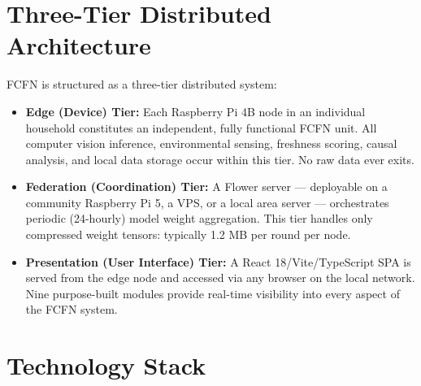 \documentclass[12pt,a4paper]{report}
\begin{document}
\section{Three-Tier Distributed Architecture}

FCFN is structured as a three-tier distributed system:

\begin{itemize}[leftmargin=2em, itemsep=0.2em]
    \item \textbf{Edge (Device) Tier:} Each Raspberry Pi 4B node in an individual household constitutes an independent, fully functional FCFN unit. All computer vision inference, environmental sensing, freshness scoring, causal analysis, and local data storage occur within this tier. No raw data ever exits.
    \item \textbf{Federation (Coordination) Tier:} A Flower server — deployable on a community Raspberry Pi 5, a VPS, or a local area server — orchestrates periodic (24-hourly) model weight aggregation. This tier handles only compressed weight tensors: typically 1.2 MB per round per node.
    \item \textbf{Presentation (User Interface) Tier:} A React 18/Vite/TypeScript SPA is served from the edge node and accessed via any browser on the local network. Nine purpose-built modules provide real-time visibility into every aspect of the FCFN system.
\end{itemize}

\section{Technology Stack}
\end{document}
